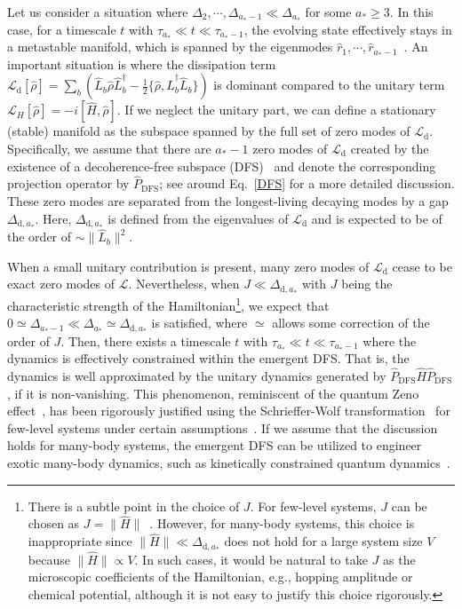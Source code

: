 \documentclass[preprint,pteplogo]{ptephy_v2}%
\numberwithin{equation}{section}
\theoremstyle{definition}
\newcommand{\ml}[1]{\mathcal{#1}}
\newcommand{\mr}[1]{\mathrm{#1}}
\begin{document}
Let us consider a situation where $\Delta_2,\cdots, \Delta_{a_*-1}\ll \Delta_{a_*}$ for some $a_*\geq 3$.
In this case, for a timescale $t$ with $\tau_{a_*}\ll t\ll \tau_{a_*-1}$, the evolving state effectively stays in a metastable manifold, which is spanned by the eigenmodes $\hat{r}_1,\cdots, \hat{r}_{a_*-1}$~\cite{macieszczak2016towards}.
An important situation is where the dissipation term $\ml{L}_\mr{d}[\hat{\rho}]=\sum_b(\hat{L}_b\hat{\rho}\hat{L}_b^\dag-\frac{1}{2}\{\hat{\rho},\hat{L}_b^\dag\hat{L}_b\})$ is dominant compared to the unitary term $\ml{L}_H[\hat{\rho}]=-i[\hat{H},\hat{\rho}]$.
If we neglect the unitary part, we can define a stationary (stable) manifold as the subspace spanned by the full set of zero modes of $\ml{L}_\mr{d}$. 
Specifically, we assume that there are $a_*-1$ zero modes of $\ml{L}_\mr{d}$ created by the existence of a decoherence-free subspace (DFS)~\cite{lidar1998decoherence, beige2000quantum} and denote the corresponding projection operator by $\hat{P}_\mr{DFS}$; see around Eq.~\eqref{DFS} for a more detailed discussion.
These zero modes are separated from the longest-living decaying modes by a gap $\Delta_{\mr{d},a_*}$. 
Here, $\Delta_{\mr{d},a_*}$ is defined from the eigenvalues of $\ml{L}_\mr{d}$ and is expected to be of the order of $\sim \|\hat{L}_b\|^2$. 

When a small unitary contribution is present, many zero modes of $\ml{L}_\mr{d}$ cease to be exact zero modes of $\ml{L}$.
Nevertheless, when $J\ll \Delta_{\mr{d},a_*}$ with $J$ being the characteristic strength of the Hamiltonian\footnote{\label{Foot1}
There is a subtle point in the choice of $J$. 
For few-level systems, $J$ can be chosen as $J=\|\hat{H}\|$~\cite{gong2020error}. 
However, for many-body systems, this choice is inappropriate since $\|\hat{H}\|\ll \Delta_{\mr{d},a_*}$ does not hold for a large system size $V$ because $\|\hat{H}\|\propto V$. 
In such cases, it would be natural to take $J$ as the microscopic coefficients of the Hamiltonian, e.g., hopping amplitude or chemical potential, although it is not easy to justify this choice rigorously.
}, we expect that $0\simeq \Delta_{a_*-1}\ll \Delta_{a_*}\simeq\Delta_{\mr{d},a_*} $ is satisfied, where $\simeq$ allows some correction of the order of $J$.
Then, there exists a timescale $t$ with $\tau_{a_*}\ll t\ll \tau_{a_*-1}$ where the dynamics is effectively constrained within the emergent DFS.
That is, the dynamics is well approximated by the unitary dynamics generated by $\hat{P}_\mr{DFS}\hat{H}\hat{P}_\mr{DFS}$, if it is non-vanishing.
This phenomenon, reminiscent of the quantum Zeno effect~\cite{misra1977zeno, beige2000quantum, facchi2002quantum, zanardi2014coherent}, has been rigorously justified using the Schrieffer-Wolf transformation~\cite{schrieffer1966relation} for few-level systems under certain assumptions~\cite{gong2020error}.
If we assume that the discussion holds for many-body systems, the emergent DFS can be utilized to engineer~\cite{harrington2022engineered} exotic many-body dynamics, such as kinetically constrained quantum dynamics~\cite{stannigel2014constrained, maity2024kinetically}.
\end{document}
